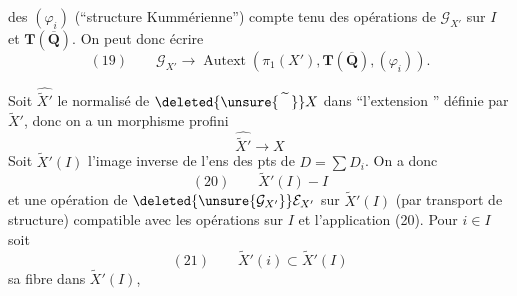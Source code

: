des $(\varphi_i)$ (``structure Kummérienne'')
compte tenu des opérations  de $\mathcal G_{X'}$
sur $I$ et $\mathbf T(\overline{\mathbf Q})$. On peut donc
écrire
\[
(19)\qquad\mathcal G_{X'}\longrightarrow\operatorname{Autext}(\pi_1(X'),\mathbf T(\overline{\mathbf Q}),(\varphi_i)).
\]

Soit $\widehat{\widetilde X'}$ le normalisé de $\deleted{\unsure{\widetilde{\phantom X}}}X$ dans ``l'extension
'' définie par $\widetilde X'$, donc on a un
morphisme profini
\[
\widehat{\widetilde X'}\longrightarrow X
\]
Soit $\widetilde X'(I)$ l'image inverse de l'ens des
pts   de $D=\sum D_i$. On a
donc
\[
(20)\qquad\widetilde X'(I)\mathbin{-}I
\]
et une opération de $\deleted{\unsure{\mathcal G_{X'}}}\mathcal E_{X'}$ sur
$\widetilde X'(I)$ (par transport de structure)
compatible avec les opérations sur $I$
et l'application (20). Pour $i\in I$ soit
\[
(21)\qquad\widetilde X'(i)\subset\widetilde X'(I)
\]
sa fibre dans $\widetilde X'(I)$, 
